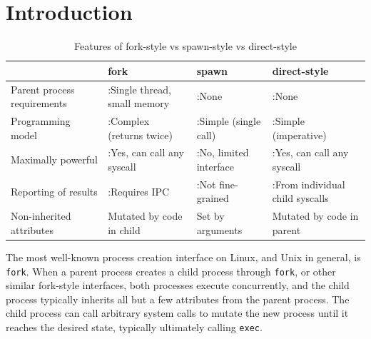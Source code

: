 \documentclass[letterpaper,twocolumn,10pt]{article}
\newcommand{\cmark}{\ding{51}}
\newcommand{\xmark}{\ding{55}}
\newcommand{\tbad}{\xmark:}
\newcommand{\tgood}{\cmark:}
\begin{document}
\section{Introduction}\label{introduction}
\begin{table}
\begin{tabular}{l|l|l|l}
 & fork & spawn & direct-style\\
\hline
Parent process requirements & \tbad Single thread, small memory & \tgood None & \tgood None\\
Programming model & \tbad Complex (returns twice) & \tgood Simple (single call) & \tgood Simple (imperative)\\
Maximally powerful & \tgood Yes, can call any syscall & \tbad No, limited interface & \tgood Yes, can call any syscall\\
Reporting of results & \tbad Requires IPC & \tbad Not fine-grained & \tgood From individual child syscalls\\
Non-inherited attributes & Mutated by code in child & Set by arguments & Mutated by code in parent\\
\end{tabular}
\caption{Features of fork-style vs spawn-style vs direct-style}
\label{tab:styles}
\end{table}

The most well-known process creation interface on Linux, and Unix in general, is \texttt{fork}.
When a parent process creates a child process through \texttt{fork},
or other similar fork-style interfaces,
both processes execute concurrently,
and the child process typically inherits all but a few attributes from the parent process.\cite{manfork}
The child process can call arbitrary system calls
to mutate the new process until it reaches the desired state,
typically ultimately calling \texttt{exec}.
\end{document}

